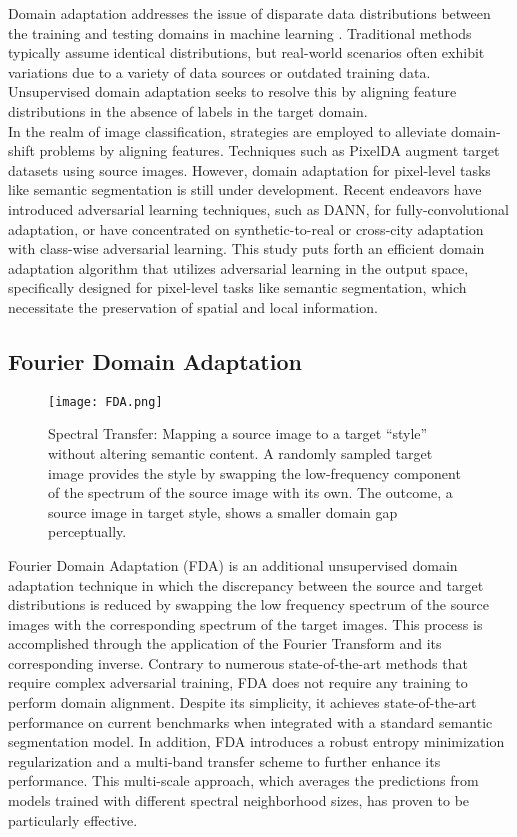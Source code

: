 \documentclass[10pt,twocolumn,letterpaper]{article}
\begin{document}
Domain adaptation addresses the issue of disparate data distributions between the training and testing domains in machine learning \cite{CD}. Traditional methods typically assume identical distributions, but real-world scenarios often exhibit variations due to a variety of data sources or outdated training data. Unsupervised domain adaptation seeks to resolve this by aligning feature distributions in the absence of labels in the target domain.\\
In the realm of image classification, strategies are employed to alleviate domain-shift problems by aligning features. Techniques such as PixelDA augment target datasets using source images. However, domain adaptation for pixel-level tasks like semantic segmentation is still under development.  Recent endeavors have introduced adversarial learning techniques, such as DANN, for fully-convolutional adaptation, or have concentrated on synthetic-to-real or cross-city adaptation with class-wise adversarial learning. This study \cite{DomAd} puts forth an efficient domain adaptation algorithm that utilizes adversarial learning in the output space, specifically designed for pixel-level tasks like semantic segmentation, which necessitate the preservation of spatial and local information.

\subsection{Fourier Domain Adaptation}

\begin{figure}[h]
  \centering
   \texttt{[image: FDA.png]}
   \caption{Spectral Transfer: Mapping a source image to a target “style” without altering semantic content. A randomly sampled target
image provides the style by swapping the low-frequency component of the spectrum of the source image with its own. The outcome, a source
image in target style, shows a smaller domain gap perceptually.
   }
   \label{fig:fda}
\end{figure}

Fourier Domain Adaptation (FDA) \cite{fda} is an additional unsupervised domain adaptation technique in which the discrepancy between the source and target distributions is reduced by swapping the low frequency spectrum  of the source images with the corresponding spectrum of the target images. 
This process is accomplished through the application of the Fourier Transform and its corresponding inverse.
Contrary to numerous state-of-the-art methods that require complex adversarial training, FDA does not require any training to perform domain alignment. Despite its simplicity, it achieves state-of-the-art performance on current benchmarks when integrated with a standard semantic segmentation model. 
In addition, FDA introduces a robust entropy minimization regularization and a multi-band transfer scheme to further enhance its performance. This multi-scale approach, which averages the predictions from models trained with different spectral neighborhood sizes, has proven to be particularly effective.\\
\end{document}
